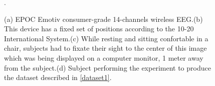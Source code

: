    
\begin{figure}[h!]
\centering
{}
\caption[EPOC Emotiv Alpha Waves Dataset]{(a) EPOC Emotiv consumer-grade 14-channels wireless EEG.(b) This device has a fixed set of positions according to the 10-20 International System.(c) While resting and sitting confortable in a chair, subjects had to fixate their sight to the center of this image which was being displayed on a computer monitor, 1 \si{meter} away from the subject.(d) Subject performing the experiment to produce the dataset described in \ref{dataset1}.}.
\label{fig:alpharesults}
\end{figure}

